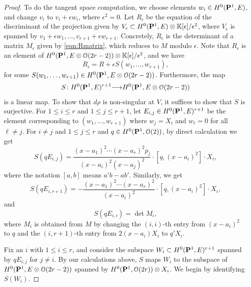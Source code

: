 \documentclass[11pt,reqno]{amsart}
\theoremstyle{plain}
\theoremstyle{definition}
\theoremstyle{remark}
\numberwithin{equation}{section}
\renewcommand{\k}{\mathbb{K}}
\renewcommand{\to}{{\longrightarrow}}
\numberwithin{equation}{section}
\renewcommand{\O}{\mathcal O}
\begin{document}
\begin{proof}
  To do the tangent space computation, we choose elements $w_i \in H^0(\P^1, E)$, and change $v_i$ to $v_i + \epsilon w_i$, where $\epsilon^2 = 0$.
  Let $R_\epsilon$ be the equation of the discriminant of the projection given by $V_\epsilon \subset H^0(\P^1, E) \otimes \k[\epsilon]/\epsilon^2$, where $V_\epsilon$ is spanned by $v_1 + \epsilon w_1, \dots, v_{r+1} + \epsilon w_{r+1}$.
  Concretely, $R_\epsilon$ is the determinant of a matrix $M_\epsilon$ given by \eqref{eqn:Rmatrix}, which reduces to $M$ modulo $\epsilon$.
  Note that $R_\epsilon$ is an element of $H^0(\P^1, E \otimes \O(2r-2)) \otimes \k[\epsilon]/\epsilon^2$, and we have
  \[ R_\epsilon =  R + \epsilon S(w_1, \dots, w_{r+1}),\]
  for some $S(w_1, \dots, w_{r+1}) \in H^0(\P^1, E \otimes \O(2r-2))$.
  Furthermore, the map
  \begin{equation}\label{eqn:mainmap}
    S \from H^0(\P^1, E)^{r+1} \to H^0(\P^1, E \otimes \O(2r-2))
  \end{equation}
  is a linear map.
  To show that $d \rho$ is non-singular at $V$, it suffices to show that $S$ is surjective.
  For $1 \leq i \leq r$ and $1 \leq j \leq r+1$, let $E_{i,j} \in H^0(\P^1, E)^{r+1}$ be the element corresponding to $(w_1, \dots, w_{r+1})$ where $w_j = X_i$ and $w_\ell = 0$ for all $\ell \neq j$.
  For $i \neq j$ and $1 \leq j \leq r$ and $q \in H^0(\P^1, \O(2))$, by direct calculation we get
  \[ S\left(qE_{i,j}\right) = \frac{(x-a_1)^2 \cdots (x-a_r)^2p_j}{(x-a_i)^2(x-a_j)^2} \cdot [q, (x-a_i)^2] \cdot X_i,\]
  where the notation $[a,b]$ means $a'b-ab'$.
  Similarly, we get
  \[ S\left(qE_{i,r+1}\right) = - \frac{(x-a_1)^2 \cdots (x-a_r)^2}{(x-a_i)^2} \cdot [q, (x-a_i)^2] \cdot X_i,\]
  and
  \begin{equation}\label{eqn:diag}
    S\left(qE_{i,i} \right) = \det M_i,
  \end{equation}
  where $M_i$ is obtained from $M$ by changing the $(i,i)$-th entry from $(x-a_i)^2$ to $q$ and the $(i,r+1)$-th entry from $2(x-a_i)X_i$ to $q'X_i$.

  Fix an $i$ with $1 \leq i \leq r$, and consider the subspace $W_i \subset H^0(\P^1, E)^{r+1}$ spanned by $q E_{i,j}$ for $j \neq i$.
  By our calculations above, $S$ maps $W_i$ to the subspace of $H^0(\P^1, E \otimes \O(2r-2))$ spanned by $H^0(\P^1, \O(2r)) \otimes X_i$.
  We begin by identifying $S(W_i)$.


\end{proof}
\end{document}
